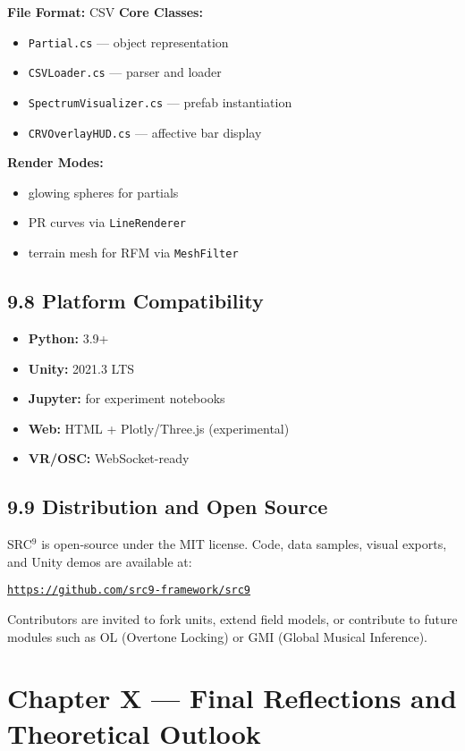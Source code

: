 \documentclass[10pt]{article}
\begin{document}
\textbf{File Format:} CSV  
\textbf{Core Classes:}
\begin{itemize}
    \item \texttt{Partial.cs} — object representation
    \item \texttt{CSVLoader.cs} — parser and loader
    \item \texttt{SpectrumVisualizer.cs} — prefab instantiation
    \item \texttt{CRVOverlayHUD.cs} — affective bar display
\end{itemize}

\textbf{Render Modes:}
\begin{itemize}
    \item glowing spheres for partials
    \item PR curves via \texttt{LineRenderer}
    \item terrain mesh for RFM via \texttt{MeshFilter}
\end{itemize}

\subsection*{9.8 Platform Compatibility}

\begin{itemize}
    \item \textbf{Python:} 3.9+
    \item \textbf{Unity:} 2021.3 LTS
    \item \textbf{Jupyter:} for experiment notebooks
    \item \textbf{Web:} HTML + Plotly/Three.js (experimental)
    \item \textbf{VR/OSC:} WebSocket-ready
\end{itemize}

\subsection*{9.9 Distribution and Open Source}

SRC$^{9}$ is open-source under the MIT license. Code, data samples, visual exports, and Unity demos are available at:

\texttt{\url{https://github.com/src9-framework/src9}}

Contributors are invited to fork units, extend field models, or contribute to future modules such as OL (Overtone Locking) or GMI (Global Musical Inference).

\section*{Chapter X — Final Reflections and Theoretical Outlook}
\end{document}
